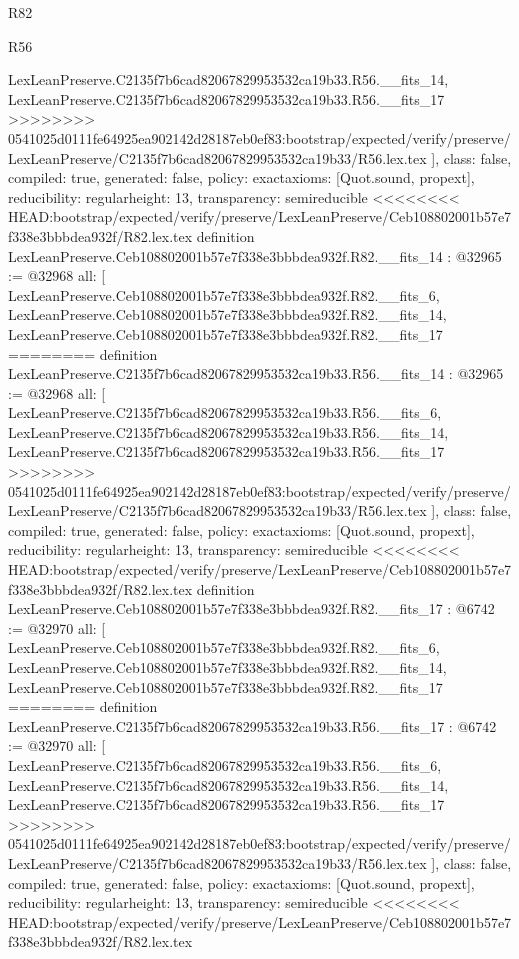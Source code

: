 \begin{lexlean}{R82}
\begin{lexlean}{R56}
\begin{coremodule}
{{{{{{{{{{{{{{{{{{{{{{{{{{{{{{{{{{{{{{{{{{{{{{{{{{{{{{{{{{{{{{{{{{{{{{{{{{{{{{{{{{{{{{{{{{{{{{{{{{{{{{{{{{{{{{{{{{{{{{{{{{{{{{{{{{{{{{{{{{{{{{{{{{{{{{{{{{{{    LexLeanPreserve.C2135f7b6cad82067829953532ca19b33.R56.__fits_14,
    LexLeanPreserve.C2135f7b6cad82067829953532ca19b33.R56.__fits_17
>>>>>>>> 0541025d0111fe64925ea902142d28187eb0ef83:bootstrap/expected/verify/preserve/LexLeanPreserve/C2135f7b6cad82067829953532ca19b33/R56.lex.tex
  ],
  class: false,
  compiled: true,
  generated: false,
  policy: exact{axioms: [Quot.sound, propext]},
  reducibility: regular{height: 13},
  transparency: semireducible
}
<<<<<<<< HEAD:bootstrap/expected/verify/preserve/LexLeanPreserve/Ceb108802001b57e7f338e3bbbdea932f/R82.lex.tex
definition LexLeanPreserve.Ceb108802001b57e7f338e3bbbdea932f.R82.__fits_14 : @32965 := @32968 {
  all: [
    LexLeanPreserve.Ceb108802001b57e7f338e3bbbdea932f.R82.__fits_6,
    LexLeanPreserve.Ceb108802001b57e7f338e3bbbdea932f.R82.__fits_14,
    LexLeanPreserve.Ceb108802001b57e7f338e3bbbdea932f.R82.__fits_17
========
definition LexLeanPreserve.C2135f7b6cad82067829953532ca19b33.R56.__fits_14 : @32965 := @32968 {
  all: [
    LexLeanPreserve.C2135f7b6cad82067829953532ca19b33.R56.__fits_6,
    LexLeanPreserve.C2135f7b6cad82067829953532ca19b33.R56.__fits_14,
    LexLeanPreserve.C2135f7b6cad82067829953532ca19b33.R56.__fits_17
>>>>>>>> 0541025d0111fe64925ea902142d28187eb0ef83:bootstrap/expected/verify/preserve/LexLeanPreserve/C2135f7b6cad82067829953532ca19b33/R56.lex.tex
  ],
  class: false,
  compiled: true,
  generated: false,
  policy: exact{axioms: [Quot.sound, propext]},
  reducibility: regular{height: 13},
  transparency: semireducible
}
<<<<<<<< HEAD:bootstrap/expected/verify/preserve/LexLeanPreserve/Ceb108802001b57e7f338e3bbbdea932f/R82.lex.tex
definition LexLeanPreserve.Ceb108802001b57e7f338e3bbbdea932f.R82.__fits_17 : @6742 := @32970 {
  all: [
    LexLeanPreserve.Ceb108802001b57e7f338e3bbbdea932f.R82.__fits_6,
    LexLeanPreserve.Ceb108802001b57e7f338e3bbbdea932f.R82.__fits_14,
    LexLeanPreserve.Ceb108802001b57e7f338e3bbbdea932f.R82.__fits_17
========
definition LexLeanPreserve.C2135f7b6cad82067829953532ca19b33.R56.__fits_17 : @6742 := @32970 {
  all: [
    LexLeanPreserve.C2135f7b6cad82067829953532ca19b33.R56.__fits_6,
    LexLeanPreserve.C2135f7b6cad82067829953532ca19b33.R56.__fits_14,
    LexLeanPreserve.C2135f7b6cad82067829953532ca19b33.R56.__fits_17
>>>>>>>> 0541025d0111fe64925ea902142d28187eb0ef83:bootstrap/expected/verify/preserve/LexLeanPreserve/C2135f7b6cad82067829953532ca19b33/R56.lex.tex
  ],
  class: false,
  compiled: true,
  generated: false,
  policy: exact{axioms: [Quot.sound, propext]},
  reducibility: regular{height: 13},
  transparency: semireducible
}
<<<<<<<< HEAD:bootstrap/expected/verify/preserve/LexLeanPreserve/Ceb108802001b57e7f338e3bbbdea932f/R82.lex.tex
}}}}}}}}}}}}}}}}}}}}}}}}}}}}}}}}}}}}}}}}}}}}}}}}}}}}}}}}}}}}}}}}}}}}}}}}}}}}}}}}}}}}}}}}}}}}}}}}}}}}}}}}}}}}}}}}}}}}}}}}}}}}}}}}}}}}}}}}}}}}}}}}}}}}}}}}}}}}}
\end{coremodule}
\end{lexlean}
\end{lexlean}
